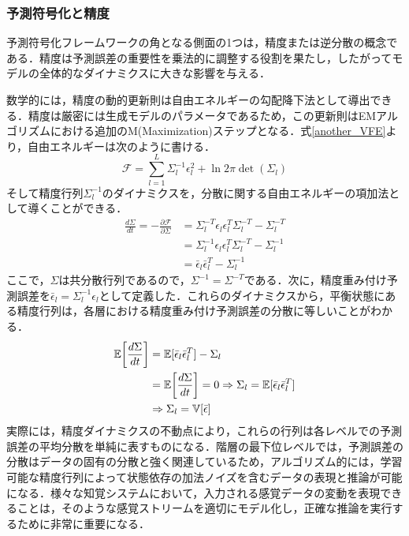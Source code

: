 \documentclass[a4paper, titlepage]{jsarticle}
\begin{document}
\subsubsection{予測符号化と精度}
予測符号化フレームワークの角となる側面の1つは，精度または逆分散の概念である．精度は予測誤差の重要性を乗法的に調整する役割を果たし，したがってモデルの全体的なダイナミクスに大きな影響を与える．
\par
数学的には，精度の動的更新則は自由エネルギーの勾配降下法として導出できる．精度は厳密には生成モデルのパラメータであるため，この更新則はEMアルゴリズムにおける追加のM(Maximization)ステップとなる．式\eqref{another_VFE}より，自由エネルギーは次のように書ける．
\begin{equation}
   \mathcal{F}=\sum_{l=1}^L\Sigma_l^{-1}\epsilon_l^2+\ln2\pi\det(\Sigma_l)
\end{equation}
そして精度行列$\Sigma_l^{-1}$のダイナミクスを，分散に関する自由エネルギーの項加法として導くことができる．
\begin{equation}
   \begin{aligned}
      \frac{d\Sigma}{dt}=-\frac{\partial\mathcal{F}}{\partial\Sigma}&=\Sigma_l^{-T}\epsilon_l\epsilon_l^T\Sigma_l^{-T}-\Sigma_l^{-T} \\
      &=\Sigma_l^{-1}\epsilon_l\epsilon_l^T\Sigma_l^{-T}-\Sigma_l^{-1} \\
      &=\bar{\epsilon}_l\bar{\epsilon}_l^T-\Sigma_l^{-1}
   \end{aligned}
\end{equation}
ここで，$\Sigma$は共分散行列であるので，$\Sigma^{-1}=\Sigma^{-T}$\;である．次に，精度重み付け予測誤差を\;$\bar{\epsilon}_l=\Sigma_l^{-1}\epsilon_l$\;として定義した．これらのダイナミクスから，平衡状態にある精度行列は，各層における精度重み付け予測誤差の分散に等しいことがわかる．
\begin{equation}
   \begin{aligned}
      \mathbb{E}\qty[\frac{d\Sigma}{dt}]&=\mathbb{E}[\bar{\epsilon}_l\bar{\epsilon}_l^T]-\Sigma_l \\
      &=\mathbb{E}\qty[\frac{d\Sigma}{dt}]=0\Rightarrow\Sigma_l=\mathbb{E}[\bar{\epsilon}_l\bar{\epsilon}_l^T] \\
      &\Rightarrow\Sigma_l=\mathbb{V}[\bar{\epsilon}]
   \end{aligned}
\end{equation}
実際には，精度ダイナミクスの不動点により，これらの行列は各レベルでの予測誤差の平均分散を単純に表すものになる．階層の最下位レベルでは，予測誤差の分散はデータの固有の分散と強く関連しているため，アルゴリズム的には，学習可能な精度行列によって状態依存の加法ノイズを含むデータの表現と推論が可能になる．様々な知覚システムにおいて，入力される感覚データの変動を表現できることは，そのような感覚ストリームを適切にモデル化し，正確な推論を実行するために非常に重要になる．
\end{document}
